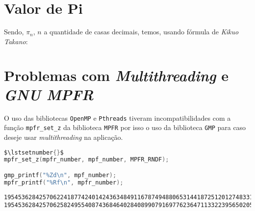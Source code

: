 \begin{appendixenv}[Apêndices]
    \section{Valor de Pi} \label{apx:pi-number}

    Sendo, $\pi_n$, $n$ a quantidade de casas decimais, temos, usando fórmula de \textit{Kikuo Takano}:

    

    \cleardoublepage

    \section{Problemas com \textit{Multithreading} e \textit{GNU MPFR}} \label{apx:multithreading}

    O uso das bibliotecas \verb|OpenMP| e \verb|Pthreads| tiveram incompatibilidades com a função \verb|mpfr_set_z| da biblioteca \verb|MPFR| por isso o uso da biblioteca \verb|GMP| para caso deseje usar \textit{multithreading} na aplicação.
   
\newcommand\lstsetnumber[1]{\gdef\thelstnumber{#1}}
\lstsetnumber{\ldots}
\begin{lstlisting}[name=multithreading,language=c,style=macrocode,mathescape=true]
$\lstsetnumber{}$ 
mpfr_set_z(mpfr_number, mpf_number, MPFR_RNDF);

gmp_printf("%Zd\n", mpf_number);
mpfr_printf("%Rf\n", mpfr_number);
\end{lstlisting}
   
\begin{lstlisting}[name=multithreading,style=macrocode,frame=single,numbers=none,mathescape=true]
195453628425706224187742401424363484911678749488065314418725120127483317234$\dots$
195453628425706258249554087436846402840899079169776236471133223956502053110$\dots$
\end{lstlisting}

\end{appendixenv}
